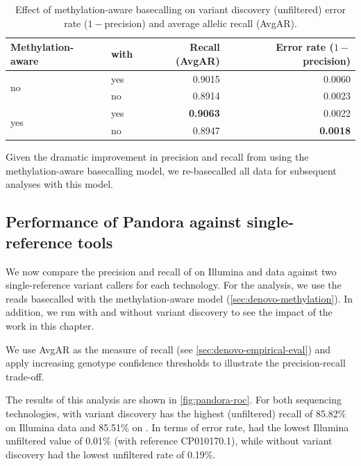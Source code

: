 \begin{table}
\centering
\begin{tabular}{@{}llrr@{}}
\toprule
    Methylation-aware    & with \denovo{} & Recall (AvgAR)  & Error rate ($1-$precision) \\ \midrule
\multirow{2}{*}{no}  & yes                   & 0.9015          & 0.0060                   \\
                     & no                    & 0.8914          & 0.0023                   \\
\multirow{2}{*}{yes} & yes                   & \textbf{0.9063} & 0.0022                   \\
                     & no                    & 0.8947          & \textbf{0.0018}          \\ \cmidrule(l){2-4} 
\end{tabular}
    \caption{Effect of \ont{} methylation-aware basecalling on \pandora{} \denovo{} variant discovery (unfiltered) error rate ($1-$precision) and average allelic recall (AvgAR).}
\label{tab:denovo-methylation}
\end{table}

\noindent
Given the dramatic improvement in precision and recall from using the methylation-aware basecalling model, we re-basecalled all data for subsequent analyses with this model.

\subsection{Performance of Pandora against single-reference tools}
\label{sec:pandora-roc-results}

We now compare the precision and recall of \pandora{} on Illumina and \ont{} data against two single-reference variant callers for each technology. For the \ont{} analysis, we use the reads basecalled with the methylation-aware model (\autoref{sec:denovo-methylation}). In addition, we run \pandora{} with and without \denovo{} variant discovery to see the impact of the work in this chapter.

We use AvgAR as the measure of recall (see \autoref{sec:denovo-empirical-eval}) and apply increasing genotype confidence thresholds to illustrate the precision-recall trade-off. 

The results of this analysis are shown in \autoref{fig:pandora-roc}. For both sequencing technologies, \pandora{} with \denovo{} variant discovery has the highest (unfiltered) recall of 85.82\% on Illumina data and 85.51\% on \ont{}. In terms of error rate,  had the lowest Illumina unfiltered value of 0.01\% (with reference CP010170.1), while \pandora{} without \denovo{} variant discovery had the lowest \ont{} unfiltered rate of 0.19\%. 

